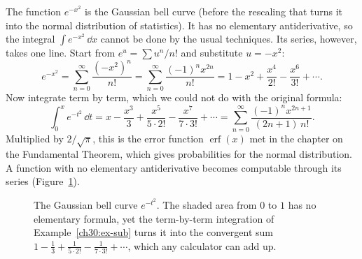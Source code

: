 \begin{example}
\label{ch30:ex-sub}
The function $e^{-x^2}$ is the Gaussian bell curve (before the rescaling that turns it into the normal distribution of statistics). It has no elementary antiderivative, so the integral $\int e^{-x^2}\,\dd x$ cannot be done by the usual techniques. Its series, however, takes one line. Start from $e^u = \sum u^n/n!$ and substitute $u = -x^2$:
\[
  e^{-x^2} = \sum_{n=0}^{\infty}\frac{(-x^2)^n}{n!}
  = \sum_{n=0}^{\infty}\frac{(-1)^n x^{2n}}{n!}
  = 1 - x^2 + \frac{x^4}{2!} - \frac{x^6}{3!} + \cdots.
\]
Now integrate term by term, which we could not do with the original formula:
\[
  \int_0^x e^{-t^2}\,\dd t
  = x - \frac{x^3}{3} + \frac{x^5}{5\cdot 2!} - \frac{x^7}{7\cdot 3!} + \cdots
  = \sum_{n=0}^{\infty}\frac{(-1)^n x^{2n+1}}{(2n+1)\,n!}.
\]
Multiplied by $2/\sqrt{\pi}$, this is the error function $\operatorname{erf}(x)$ met in the chapter on the Fundamental Theorem, which gives probabilities for the normal distribution. A function with no elementary antiderivative becomes computable through its series (Figure~\ref{ch30:fig-gaussian}).
\end{example}

\begin{figure}[H]
\centering
{}
\caption{The Gaussian bell curve $e^{-t^2}$. The shaded area from $0$ to $1$ has no elementary formula, yet the term-by-term integration of Example~\ref{ch30:ex-sub} turns it into the convergent sum $1 - \tfrac13 + \tfrac{1}{5\cdot 2!} - \tfrac{1}{7\cdot 3!} + \cdots$, which any calculator can add up.}
\label{ch30:fig-gaussian}
\end{figure}


